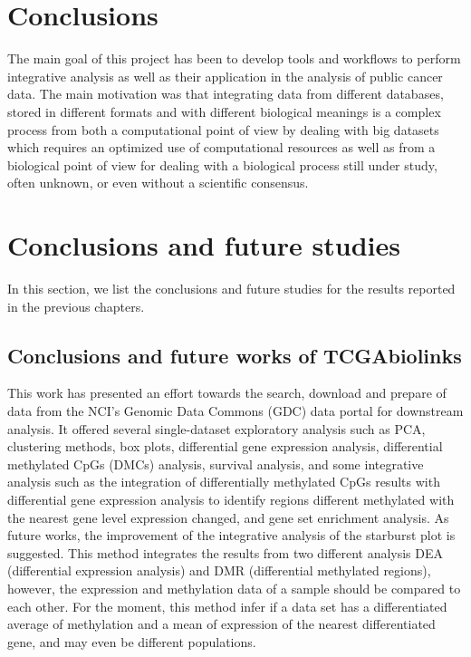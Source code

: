 \section{Conclusions}


The main goal of this project has been to develop tools and workflows to perform integrative analysis as well as their application in the analysis of public cancer data. The main motivation was that integrating data from different databases, stored in different formats and with different biological meanings is a complex process from both a computational point of view by dealing with big datasets which requires an optimized use of computational resources as well as from a biological point of view for dealing with a biological process still under study, often unknown, or even without a scientific consensus.

\section{Conclusions and future studies}

In this section, we list the conclusions and future studies for the results reported in the previous chapters.

\subsection{Conclusions and future works of TCGAbiolinks}

This work has presented an effort towards the search, download and
prepare of data from the NCI's Genomic Data Commons (GDC) data portal for
downstream analysis. It offered several single-dataset
exploratory analysis such as PCA, clustering methods, box plots,
 differential gene expression analysis, differential methylated CpGs (DMCs) analysis,
 survival analysis, and some integrative analysis
 such as the integration of differentially methylated CpGs results with  differential gene expression analysis
 to identify regions different methylated with the nearest gene level expression changed, and
 gene set enrichment analysis.
As future works, the improvement of the integrative analysis of the starburst plot is suggested. This method
integrates the results from two different analysis DEA (differential expression analysis) and DMR
(differential methylated regions), however, the expression and methylation data of a sample should be compared to each other. For the moment, this method infer if a data set has a differentiated average of methylation and a mean of
expression of the nearest differentiated gene, and may even be different populations.

